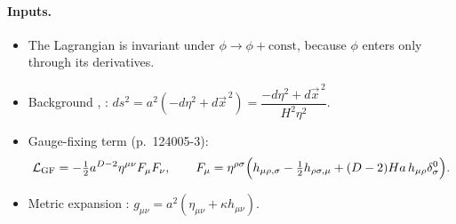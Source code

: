\paragraph{Inputs.}
\begin{itemize}[leftmargin=22pt]
\item[(G1)] \tP{} The Lagrangian  is invariant under $\phi\to\phi+\text{const}$, because $\phi$ enters only through its derivatives.
\item[(G2)] \tP{} Background , :
$ds^2=a^2(-d\eta^2+d\vec x^{\,2})=\dfrac{-d\eta^2+d\vec x^{\,2}}{H^2\eta^2}$.
\item[(G3)] \tP{} Gauge-fixing term  (p.~124005-3):
\begin{equation*}
\mathcal{L}_{\mathrm{GF}}=-\tfrac12a^{D-2}\eta^{\mu\nu}F_\mu F_\nu,\qquad
F_\mu=\eta^{\rho\sigma}\Big(h_{\mu\rho,\sigma}-\tfrac12h_{\rho\sigma,\mu}+(D-2)Ha\,h_{\mu\rho}\delta^0_\sigma\Big).
\end{equation*}
\item[(G4)] \tP{} Metric expansion : $g_{\mu\nu}=a^2(\eta_{\mu\nu}+\kappa h_{\mu\nu})$.
\end{itemize}


